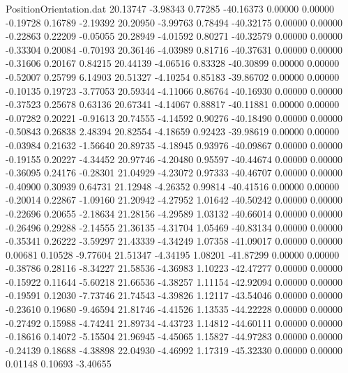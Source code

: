 \begin{filecontents}{PositionOrientation.dat}
  20.13747   -3.98343    0.77285   -40.16373    0.00000    0.00000   -0.19728    0.16789   -2.19392
  20.20950   -3.99763    0.78494   -40.32175    0.00000    0.00000   -0.22863    0.22209   -0.05055
  20.28949   -4.01592    0.80271   -40.32579    0.00000    0.00000   -0.33304    0.20084   -0.70193
  20.36146   -4.03989    0.81716   -40.37631    0.00000    0.00000   -0.31606    0.20167    0.84215
  20.44139   -4.06516    0.83328   -40.30899    0.00000    0.00000   -0.52007    0.25799    6.14903
  20.51327   -4.10254    0.85183   -39.86702    0.00000    0.00000   -0.10135    0.19723   -3.77053
  20.59344   -4.11066    0.86764   -40.16930    0.00000    0.00000   -0.37523    0.25678    0.63136
  20.67341   -4.14067    0.88817   -40.11881    0.00000    0.00000   -0.07282    0.20221   -0.91613
  20.74555   -4.14592    0.90276   -40.18490    0.00000    0.00000   -0.50843    0.26838    2.48394
  20.82554   -4.18659    0.92423   -39.98619    0.00000    0.00000   -0.03984    0.21632   -1.56640
  20.89735   -4.18945    0.93976   -40.09867    0.00000    0.00000   -0.19155    0.20227   -4.34452
  20.97746   -4.20480    0.95597   -40.44674    0.00000    0.00000   -0.36095    0.24176   -0.28301
  21.04929   -4.23072    0.97333   -40.46707    0.00000    0.00000   -0.40900    0.30939    0.64731
  21.12948   -4.26352    0.99814   -40.41516    0.00000    0.00000   -0.20014    0.22867   -1.09160
  21.20942   -4.27952    1.01642   -40.50242    0.00000    0.00000   -0.22696    0.20655   -2.18634
  21.28156   -4.29589    1.03132   -40.66014    0.00000    0.00000   -0.26496    0.29288   -2.14555
  21.36135   -4.31704    1.05469   -40.83134    0.00000    0.00000   -0.35341    0.26222   -3.59297
  21.43339   -4.34249    1.07358   -41.09017    0.00000    0.00000    0.00681    0.10528   -9.77604
  21.51347   -4.34195    1.08201   -41.87299    0.00000    0.00000   -0.38786    0.28116   -8.34227
  21.58536   -4.36983    1.10223   -42.47277    0.00000    0.00000   -0.15922    0.11644   -5.60218
  21.66536   -4.38257    1.11154   -42.92094    0.00000    0.00000   -0.19591    0.12030   -7.73746
  21.74543   -4.39826    1.12117   -43.54046    0.00000    0.00000   -0.23610    0.19680   -9.46594
  21.81746   -4.41526    1.13535   -44.22228    0.00000    0.00000   -0.27492    0.15988   -4.74241
  21.89734   -4.43723    1.14812   -44.60111    0.00000    0.00000   -0.18616    0.14072   -5.15504
  21.96945   -4.45065    1.15827   -44.97283    0.00000    0.00000   -0.24139    0.18688   -4.38898
  22.04930   -4.46992    1.17319   -45.32330    0.00000    0.00000    0.01148    0.10693   -3.40655

\end{filecontents}
